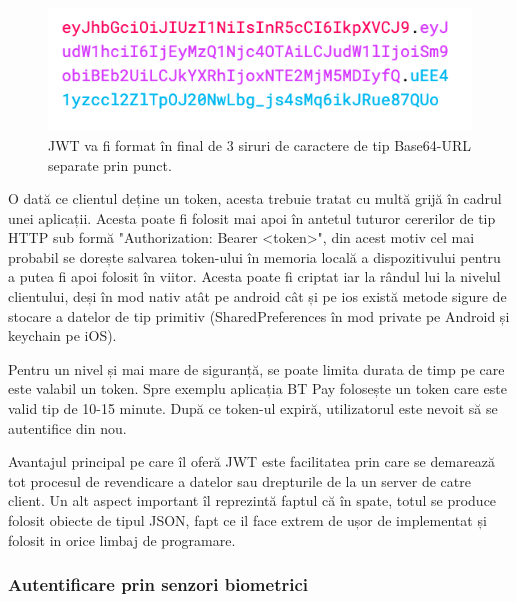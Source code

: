 \documentclass[12pt]{article}
\begin{document}
\begin{figure}[H]
    \begin{minipage}[c]{0.5\textwidth}
        \includegraphics[width=\textwidth]{jwt-all.png}
    \end{minipage}\hfill
    \begin{minipage}[c]{0.5\textwidth}
        \caption{
            JWT va fi format în final 
            de 3 siruri de caractere de tip Base64-URL separate prin punct. }
    \end{minipage}
\end{figure}

O dată ce clientul deține un token, acesta trebuie tratat cu multă grijă 
în cadrul unei aplicații. Acesta poate fi folosit mai apoi în antetul tuturor 
cererilor de tip HTTP sub formă "Authorization: Bearer <token>", din acest motiv 
cel mai probabil se dorește salvarea token-ului în memoria locală a dispozitivului
pentru a putea fi apoi folosit în viitor. Acesta poate fi criptat iar la rândul 
lui la nivelul clientului, deși în mod nativ atât pe android cât și pe ios există metode
sigure de stocare a datelor de tip primitiv (SharedPreferences în mod private pe Android și
keychain pe iOS).

Pentru un nivel și mai mare de siguranță, se poate limita durata de timp
pe care este valabil un token. Spre exemplu aplicația BT Pay folosește un token
care este valid tip de 10-15 minute. După ce token-ul expiră, utilizatorul este nevoit
să se autentifice din nou.

Avantajul principal pe care îl oferă JWT este facilitatea prin care se demarează tot procesul
de revendicare a datelor sau drepturile de la un server de catre client.  
Un alt aspect important îl reprezintă faptul că în spate, totul se produce folosit obiecte
de tipul JSON, fapt ce il face extrem de ușor de implementat și folosit in orice limbaj
de programare.

\subsubsection{Autentificare prin senzori biometrici}
\end{document}
